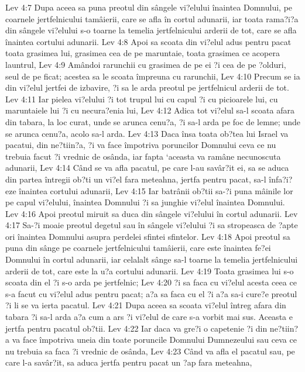 Lev 4:7  Dupa aceea sa puna preotul din sângele vi?elului înaintea Domnului, pe coarnele jertfelnicului tamâierii, care se afla în cortul adunarii, iar toata rama?i?a din sângele vi?elului s-o toarne la temelia jertfelnicului arderii de tot, care se afla înaintea cortului adunarii.
Lev 4:8  Apoi sa scoata din vi?elul adus pentru pacat toata grasimea lui, grasimea cea de pe maruntaie, toata grasimea ce acopera launtrul,
Lev 4:9  Amândoi rarunchii cu grasimea de pe ei ?i cea de pe ?olduri, seul de pe ficat; acestea sa le scoata împreuna cu rarunchii,
Lev 4:10  Precum se ia din vi?elul jertfei de izbavire, ?i sa le arda preotul pe jertfelnicul arderii de tot.
Lev 4:11  Iar pielea vi?elului ?i tot trupul lui cu capul ?i cu picioarele lui, cu maruntaiele lui ?i cu necura?enia lui,
Lev 4:12  Adica tot vi?elul sa-l scoata afara din tabara, la loc curat, unde se arunca cenu?a, ?i sa-l arda pe foc de lemne; unde se arunca cenu?a, acolo sa-l arda.
Lev 4:13  Daca însa toata ob?tea lui Israel va pacatui, din ne?tiin?a, ?i va face împotriva poruncilor Domnului ceva ce nu trebuia facut ?i vrednic de osânda, iar fapta `aceasta va ramâne necunoscuta adunarii,
Lev 4:14  Când se va afla pacatul, pe care l-au savâr?it ei, sa se aduca din partea întregii ob?ti un vi?el fara meteahna, jertfa pentru pacat, sa-l înfa?i?eze înaintea cortului adunarii,
Lev 4:15  Iar batrânii ob?tii sa-?i puna mâinile lor pe capul vi?elului, înaintea Domnului ?i sa junghie vi?elul înaintea Domnului.
Lev 4:16  Apoi preotul miruit sa duca din sângele vi?elului în cortul adunarii.
Lev 4:17  Sa-?i moaie preotul degetul sau în sângele vi?elului ?i sa stropeasca de ?apte ori înaintea Domnului asupra perdelei sfintei sfintelor.
Lev 4:18  Apoi preotul sa puna din sânge pe coarnele jertfelnicului tamâierii, care este înaintea fe?ei Domnului în cortul adunarii, iar celalalt sânge sa-l toarne la temelia jertfelnicului arderii de tot, care este la u?a cortului adunarii.
Lev 4:19  Toata grasimea lui s-o scoata din el ?i s-o arda pe jertfelnic;
Lev 4:20  ?i sa faca cu vi?elul acesta ceea ce s-a facut cu vi?elul adus pentru pacat; a?a sa faca cu el ?i a?a sa-i cure?e preotul ?i li se va ierta pacatul.
Lev 4:21  Dupa aceea sa scoata vi?elul întreg afara din tabara ?i sa-l arda a?a cum a ars ?i vi?elul de care s-a vorbit mai sus. Aceasta e jertfa pentru pacatul ob?tii.
Lev 4:22  Iar daca va gre?i o capetenie ?i din ne?tiin?a va face împotriva uneia din toate poruncile Domnului Dumnezeului sau ceva ce nu trebuia sa faca ?i vrednic de osânda,
Lev 4:23  Când va afla el pacatul sau, pe care l-a savâr?it, sa aduca jertfa pentru pacat un ?ap fara meteahna,
